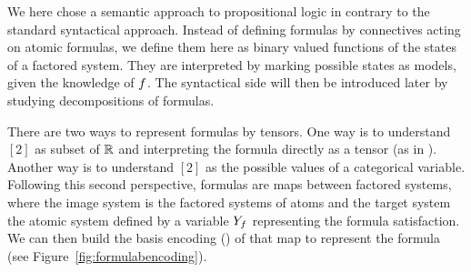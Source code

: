 




We here chose a semantic approach to propositional logic in contrary to the standard syntactical approach.
Instead of defining formulas by connectives acting on atomic formulas, we define them here as binary valued functions of the states of a factored system.
They are interpreted by marking possible states as models, given the knowledge of $f$.
The syntactical side will then be introduced later by studying decompositions of formulas.


%	




There are two ways to represent formulas by tensors.
One way is to understand $[2]$ as subset of $\mathbb{R}$ and interpreting the formula directly as a tensor (as in ).
Another way is to understand $[2]$ as the possible values of a categorical variable.
Following this second perspective, formulas are maps between factored systems, where the image system is the factored systems of atoms and the target system the atomic system defined by a variable $Y_{f}$ representing the formula satisfaction.
We can then build the basis encoding () of that map to represent the formula (see Figure~\ref{fig:formulabencoding}).

